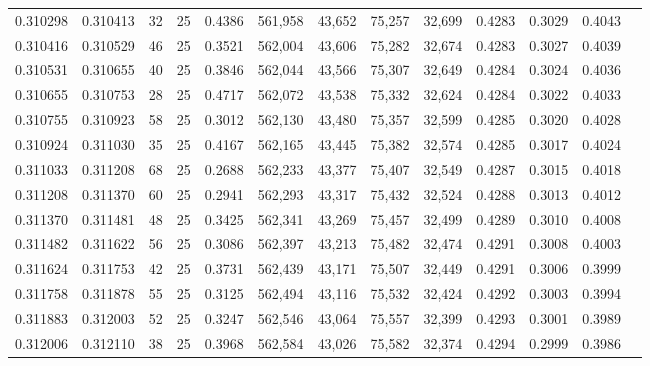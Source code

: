 \begin{tabular}{rrrrrrrrrrrrr}
0.310298 & 0.310413 &    32 &  25 &                                     0.4386 & 561,958 &  43,652 &  75,257 &  32,699 & 0.4283 & 0.3029 & 0.4043 \\
0.310416 & 0.310529 &    46 &  25 &                                     0.3521 & 562,004 &  43,606 &  75,282 &  32,674 & 0.4283 & 0.3027 & 0.4039 \\
0.310531 & 0.310655 &    40 &  25 &                                     0.3846 & 562,044 &  43,566 &  75,307 &  32,649 & 0.4284 & 0.3024 & 0.4036 \\
0.310655 & 0.310753 &    28 &  25 &                                     0.4717 & 562,072 &  43,538 &  75,332 &  32,624 & 0.4284 & 0.3022 & 0.4033 \\
0.310755 & 0.310923 &    58 &  25 &                                     0.3012 & 562,130 &  43,480 &  75,357 &  32,599 & 0.4285 & 0.3020 & 0.4028 \\
0.310924 & 0.311030 &    35 &  25 &                                     0.4167 & 562,165 &  43,445 &  75,382 &  32,574 & 0.4285 & 0.3017 & 0.4024 \\
0.311033 & 0.311208 &    68 &  25 &                                     0.2688 & 562,233 &  43,377 &  75,407 &  32,549 & 0.4287 & 0.3015 & 0.4018 \\
0.311208 & 0.311370 &    60 &  25 &                                     0.2941 & 562,293 &  43,317 &  75,432 &  32,524 & 0.4288 & 0.3013 & 0.4012 \\
0.311370 & 0.311481 &    48 &  25 &                                     0.3425 & 562,341 &  43,269 &  75,457 &  32,499 & 0.4289 & 0.3010 & 0.4008 \\
0.311482 & 0.311622 &    56 &  25 &                                     0.3086 & 562,397 &  43,213 &  75,482 &  32,474 & 0.4291 & 0.3008 & 0.4003 \\
0.311624 & 0.311753 &    42 &  25 &                                     0.3731 & 562,439 &  43,171 &  75,507 &  32,449 & 0.4291 & 0.3006 & 0.3999 \\
0.311758 & 0.311878 &    55 &  25 &                                     0.3125 & 562,494 &  43,116 &  75,532 &  32,424 & 0.4292 & 0.3003 & 0.3994 \\
0.311883 & 0.312003 &    52 &  25 &                                     0.3247 & 562,546 &  43,064 &  75,557 &  32,399 & 0.4293 & 0.3001 & 0.3989 \\
0.312006 & 0.312110 &    38 &  25 &                                     0.3968 & 562,584 &  43,026 &  75,582 &  32,374 & 0.4294 & 0.2999 & 0.3986 \\

\end{tabular}
